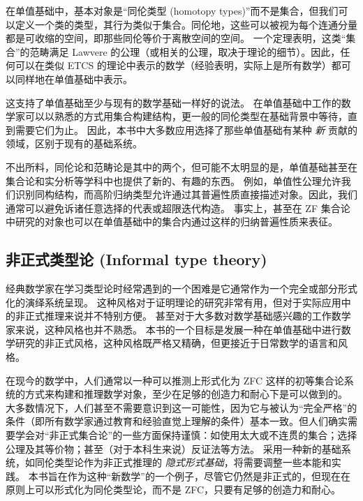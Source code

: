 在单值基础中，基本对象是“同伦类型 (homotopy types)”而不是集合，但我们可以定义一个类的类型，其行为类似于集合。同伦地，这些可以被视为每个连通分量都是可收缩的空间，即那些同伦等价于离散空间的空间。
一个定理表明，这类“集合”的范畴满足 Lawvere 的公理（或相关的公理，取决于理论的细节）。因此，任何可以在类似 ETCS 的理论中表示的数学（经验表明，实际上是所有数学）都可以同样地在单值基础中表示。

这支持了单值基础至少与现有的数学基础一样好的说法。
在单值基础中工作的数学家可以以熟悉的方式用集合构建结构，更一般的同伦类型在基础背景中等待，直到需要它们为止。
因此，本书中大多数应用选择了那些单值基础有某种 \emph{新} 贡献的领域，区别于现有的基础系统。

不出所料，同伦论和范畴论是其中的两个，但可能不太明显的是，单值基础甚至在集合论和实分析等学科中也提供了新的、有趣的东西。
例如，单值性公理允许我们识别同构结构，而高阶归纳类型允许通过其普遍性质直接描述对象。因此，我们通常可以避免诉诸任意选择的代表或超限迭代构造。
事实上，甚至在 ZF 集合论中研究的对象也可以在单值基础中的集合内通过这样的归纳普遍性质来表征。

%

\subsection*{非正式类型论 (Informal type theory)}

经典数学家在学习类型论时经常遇到的一个困难是它通常作为一个完全或部分形式化的演绎系统呈现。
这种风格对于证明理论的研究非常有用，但对于实际应用中的非正式推理来说并不特别方便。
甚至对于大多数对数学基础感兴趣的工作数学家来说，这种风格也并不熟悉。
本书的一个目标是发展一种在单值基础中进行数学研究的非正式风格，这种风格既严格又精确，但更接近于日常数学的语言和风格。

在现今的数学中，人们通常以一种可以推测上形式化为 ZFC 这样的初等集合论系统的方式来构建和推理数学对象，至少在足够的创造力和耐心下是可以做到的。
大多数情况下，人们甚至不需要意识到这一可能性，因为它与被认为“完全严格”的条件（即所有数学家通过教育和经验直觉上理解的条件）基本一致。但人们确实需要学会对“非正式集合论”的一些方面保持谨慎：如使用太大或不连贯的集合；选择公理及其等价物；甚至（对于本科生来说）反证法等方法。
采用一种新的基础系统，如同伦类型论作为非正式推理的 \emph{隐式形式基础}，将需要调整一些本能和实践。
本书旨在作为这种“新数学”的一个例子，尽管它仍然是非正式的，但现在在原则上可以形式化为同伦类型论，而不是 ZFC，只要有足够的创造力和耐心。

